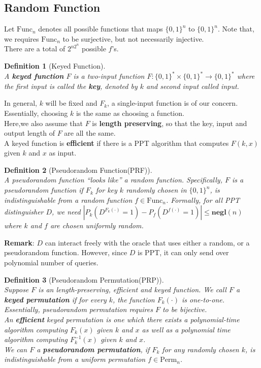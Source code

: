 \documentclass[12pt]{article}
\newtheorem{definition}{Definition}[section]
\theoremstyle{definition}
\begin{document}
\subsection{Random Function}
Let $\text{Func}_n$ denotes all possible functions that maps $\{0,1\}^n$ to $\{0,1\}^n$. Note that, we requires $\text{Func}_n$ to be surjective, but not necessarily injective.\\
There are a total of $2^{n2^n}$ possible $f$'s.
\begin{definition}[Keyed Function]
\hfill\\\normalfont A \textbf{keyed function} $F$ is a two-input function $F:\{0,1\}^\ast\times\{0,1\}^\ast\to\{0,1\}^\ast$ where the first input is called the \textbf{key}, denoted by $k$ and second input called input. 
\end{definition}
In general, $k$ will be fixed and $F_k$, a single-input function is of our concern. Essentially, choosing $k$ is the same as choosing a function.\\
Here,we also assume that $F$ is \textbf{length preserving}, so that the key, input and output length of $F$ are all the same. \\
A keyed function is \textbf{efficient} if there is a PPT algorithm that computes $F(k,x)$ given $k$ and $x$ as input.
\begin{definition}[Pseudorandom Function(PRF)]
\hfill\\\normalfont A pseudorandom function ``looks like'' a random function. Specifically, $F$ is a pseudorandom function if $F_k$ for key $k$ randomly chosen in $\{0,1\}^n$, is indistinguishable from a random function $f\in \text{Func}_n$. Formally, for all PPT distinguisher $D$, we need
$
|P_k(D^{F_k(\cdot)}=1)-P_{f}(D^{f(\cdot)}=1)|\leq \mathbf{negl}(n)
$
where $k$ and $f$ are chosen uniformly random.
\end{definition}
\textbf{Remark}: $D$ can interact freely with the oracle that uses either a random, or a pseudorandom function. However, since $D$ is PPT, it can only send over polynomial number of queries.
\begin{definition}[Pseudorandom Permutation(PRP)]
\hfill\\\normalfont Suppose $F$ is an length-preserving, efficient and keyed function. We call $F$ a \textbf{keyed permutation} if for every $k$, the function $F_k(\cdot)$ is one-to-one. Essentially, pseudorandom permutation requires $F$ to be bijective.\\
An \textbf{efficient} keyed permutation is one which there exists a polynomial-time algorithm computing $F_k(x)$ given $k$ and $x$ as well as a polynomial time algorithm computing $F_k^{-1}(x)$ given $k$ and $x$.\\
We can $F$ a \textbf{pseudorandom permutation}, if $F_k$ for any randomly chosen $k$, is indistinguishable from a uniform permutation $f\in \text{Perm}_n$.
\end{definition}
\end{document}
